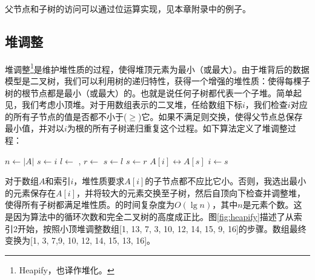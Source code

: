 \documentclass[b5paper]{ctexart}
\begin{document}
父节点和子树的访问可以通过位运算实现，见本章附录中的例子。

\subsection{堆调整}

堆调整\footnote{Heapify，也译作堆化。}是维护堆性质的过程，使得堆顶元素为最小（或最大）。由于堆背后的数据模型是二叉树，我们可以利用树的递归特性，获得一个增强的堆性质：使得每棵子树的根节点都是最小（或最大）的。也就是说任何子树都代表一个子堆。简单起见，我们考虑小顶堆。对于用数组表示的二叉堆，任给数组下标$i$，我们检查$i$对应的所有子节点的值是否都不小于($\geq$)它。如果不满足则交换，使得父节点总保存最小值\cite{CLRS}，并对以$i$为根的所有子树递归重复这个过程。如下算法定义了堆调整过程：

\begin{algorithmic}[1]
  \State $n \gets |A|$
  \Loop
    \State $s \gets i$ 
    \State $l \gets$ , $r \gets$ 
      \State $s \gets l$
    \EndIf
      \State $s \gets r$
    \EndIf
      \State {} $A[i] \leftrightarrow A[s]$
      \State $i \gets s$
    \Else
      \State \Return
    \EndIf
  \EndLoop
\EndFunction
\end{algorithmic}

对于数组$A$和索引$i$，堆性质要求$A[i]$的子节点都不应比它小。否则，我选出最小的元素保存在$A[i]$，并将较大的元素交换至子树，然后自顶向下检查并调整堆，使得所有子树都满足堆性质。的时间复杂度为$O(\lg n)$，其中$n$是元素个数。这是因为算法中的循环次数和完全二叉树的高度成正比。图\ref{fig:heapify}描述了从索引2开始，按照小顶堆调整数组[1, 13, 7, 3, 10, 12, 14, 15, 9, 16]的步骤。数组最终变换为[1, 3, 7,9, 10, 12, 14, 15, 13, 16]。
\end{document}
